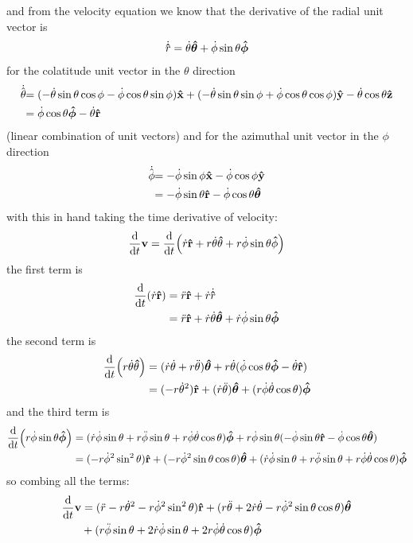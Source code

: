 \documentclass[../hw.tex]{subfiles}
\begin{document}
and from the velocity equation we know that the derivative of the radial unit vector is
\begin{align*}
    \dot{\vu r} = \dot \theta \vu* \theta + \dot \phi \sin\theta \vu* \phi
\end{align*}
for the colatitude unit vector in the $\theta$ direction
\begin{align*}
    \dot{\vu* \theta} &= (-\dot\theta \sin\theta \cos\phi  -\dot \phi \cos\theta \sin\phi) \vu x +
        (-\dot\theta \sin\theta \sin\phi + \dot \phi \cos\theta \cos\phi) \vu y 
        - \dot\theta \cos\theta \vu z \\
        &= \dot\phi \cos\theta \vu* \phi - \dot\theta \vu r
\end{align*}
(linear combination of unit vectors) and for the azimuthal unit vector in the $\phi$ direction
\begin{align*}
    \dot{\vu*\phi} &= -\dot\phi \sin\phi \vu x - \dot\phi \cos\phi \vu y \\
    &= -\dot\phi \sin\theta \vu r - \dot\phi \cos\theta \vu* \theta
\end{align*}
with this in hand taking the time derivative of velocity:
\begin{align*}
    \dv{t} \vb v &= \dv{t} (\dot r \vu r + r \dot \theta \vu \theta + r \dot \phi \sin\theta \vu \phi) \\
\end{align*}
the first term is
\begin{align*}
    \dv{t} (\dot r \vu r) &= \ddot r \vu r + \dot r \dot{\vu r} \\
    &= \ddot r \vu r + \dot r \dot \theta \vu* \theta + \dot r \dot \phi \sin\theta \vu* \phi
\end{align*}
the second term is
\begin{align*}
    \dv{t} (r \dot \theta \vu \theta) &= (\dot r \dot\theta + r \ddot \theta) \vu*\theta
        + r\dot\theta(\dot\phi \cos\theta \vu* \phi - \dot\theta \vu r) \\
    &= (-r\dot\theta^2) \vu r + (\dot r \ddot \theta) \vu*\theta
        + (r \dot\phi \dot\theta \cos\theta) \vu*\phi
\end{align*}
and the third term is
\begin{align*}
    \dv{t} (r \dot \phi \sin\theta \vu*\phi) &=
        (\dot r \dot\phi \sin\theta + r\ddot\phi \sin\theta + r \dot\phi \dot\theta \cos\theta) \vu*\phi
        + r\dot\phi \sin\theta (-\dot\phi \sin\theta \vu r - \dot\phi \cos\theta \vu*\theta) \\
    &= (-r\dot\phi^2 \sin^2\theta) \vu r 
        + (-r\dot\phi^2\sin\theta\cos\theta) \vu*\theta
        + (\dot r \dot\phi \sin\theta + r\ddot\phi\sin\theta + r \dot\phi \dot\theta \cos\theta) \vu*\phi
\end{align*}
so combing all the terms:
\begin{align*}
    \dv{t} \vb v &= (\ddot r - r\dot\theta^2 - r\dot\phi^2\sin^2\theta) \vu r
        + (r\ddot\theta + 2\dot r \dot\theta - r\dot\phi^2\sin\theta\cos\theta) \vu*\theta \\
        &+ (r\ddot\phi\sin\theta + 2\dot r \dot\phi\sin\theta + 2r\dot\phi\dot\theta\cos\theta) \vu*\phi
\end{align*}
\end{document}
